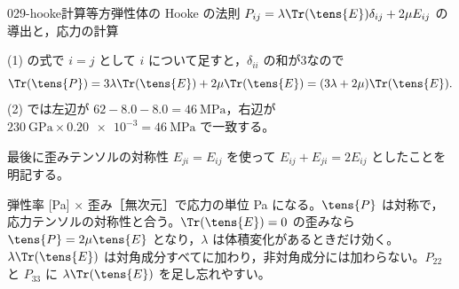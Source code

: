 \documentclass[uplatex,dvipdfmx,a4paper,11pt]{jsarticle}
\begin{document}
\begin{mondai}{029-hooke}{計算}{等方弾性体の Hooke の法則 $P_{ij}=\lambda\Tr(\tens{E})\delta_{ij}+2\mu E_{ij}$ の導出と，応力の計算}
\begin{tadashii}
 (1) の式で $i=j$ として $i$ について足すと，$\delta_{ii}$ の和が3なので
\[ \Tr(\tens{P})=3\lambda\Tr(\tens{E})+2\mu\Tr(\tens{E})=(3\lambda+2\mu)\Tr(\tens{E}). \]
(2) では左辺が $62-8.0-8.0=\qty{46}{\mega\pascal}$，右辺が $\qty{230}{\giga\pascal}\times\num{0.20e-3}=\qty{46}{\mega\pascal}$ で一致する。
\begin{ronten}
  \item {} 最後に歪みテンソルの対称性 $E_{ji}=E_{ij}$ を使って $E_{ij}+E_{ji}=2E_{ij}$ としたことを明記する。
\end{ronten}
\kenzan 弾性率 [\unit{\pascal}] × 歪み［無次元］で応力の単位 \unit{\pascal} になる。$\tens{P}$ は対称で，応力テンソルの対称性と合う。$\Tr(\tens{E})=0$ の歪みなら $\tens{P}=2\mu\tens{E}$ となり，$\lambda$ は体積変化があるときだけ効く。
\tsumazuki $\lambda\Tr(\tens{E})$ は対角成分すべてに加わり，非対角成分には加わらない。$P_{22}$ と $P_{33}$ に $\lambda\Tr(\tens{E})$ を足し忘れやすい。
\end{tadashii}
\end{mondai}
\end{document}
